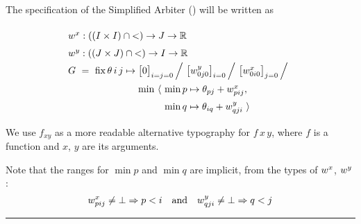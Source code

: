 \noindent
The specification of the Simplified Arbiter () will be written as

\vspace{-5mm}
\[
  \renewcommand\arraystretch{1.5}
  \begin{array}{@{}l@{}l@{}l@{}}
    \lspan3{\xw{} : ((I\times I)\cap{<})\to J\to\R} \\
    \lspan3{\yw{} : ((J\times J)\cap{<})\to I\to\R} \\
    G ~=~ \fix \theta\,i\,j\mapsto{}
      & \lspan2{\big[0\big]_{i=j=0} \,\Big/~ \big[\yw{0j0}\big]_{i=0} \,\Big/~ \big[\xw{0i0}\big]_{j=0} \,\Big/} \\
      & \min~\langle~ & \min p\mapsto\theta_{pj}+\xw{pij}, \\
      & & \min q\mapsto\theta_{iq}+\yw{qji} ~\rangle
  \end{array}
\]

We use $f_{xy}$
as a more readable alternative typography for $f\,x\,y$,
where $f$ is a function and $x$, $y$ are its arguments.

Note that the ranges for $\min p$ and $\min q$ are implicit, from the types of
$w^x_{}$, $w^y_{}$: \[w^x_{pij}\neq\bot\Rightarrow p<i \quad \mbox{and} \quad w^y_{qji}\neq\bot\Rightarrow q<j\]

\hrule
